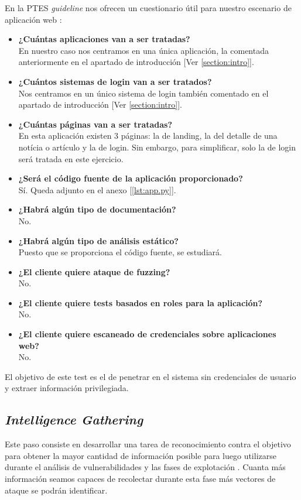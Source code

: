 \documentclass[a4paper,oneside]{article}
\begin{document}
En la PTES \textit{guideline} nos ofrecen un cuestionario útil para nuestro escenario de aplicación web \cite{prengage}:
\begin{itemize}
\item \textbf{¿Cuántas aplicaciones van a ser tratadas?}\\
En nuestro caso nos centramos en una única aplicación, la comentada anteriormente en el apartado de introducción [Ver \ref{section:intro}].
\item \textbf{¿Cuántos sistemas de login van a ser tratados?}\\
Nos centramos en un único sistema de login también comentado en el apartado de introducción [Ver \ref{section:intro}].

\pagebreak
\item \textbf{¿Cuántas páginas van a ser tratadas?}\\
En esta aplicación existen 3 páginas: la de landing, la del detalle de una notícia o artículo y la de login. Sin embargo, para simplificar, solo la de login será tratada en este ejercicio.
\item \textbf{¿Será el código fuente de la aplicación proporcionado?}\\
Sí. Queda adjunto en el anexo [\ref{lst:app.py}].
\item \textbf{¿Habrá algún tipo de documentación?}\\
No.
\item \textbf{¿Habrá algún tipo de análisis estático?}\\
Puesto que se proporciona el código fuente, se estudiará.
\item \textbf{¿El cliente quiere ataque de fuzzing?}\\
No.
\item \textbf{¿El cliente quiere tests basados en roles para la aplicación?}\\
No.
\item \textbf{¿El cliente quiere escaneado de credenciales sobre aplicaciones web?}\\
No.
\end{itemize}

El objetivo de este test es el de penetrar en el sistema sin credenciales de usuario y extraer información privilegiada.

\subsection{\textit{Intelligence Gathering}}
Este paso consiste en desarrollar una tarea de reconocimiento contra el objetivo para obtener la mayor cantidad de información posible para luego utilizarse durante el análisis de vulnerabilidades y las fases de explotación \cite{intelligence}.
Cuanta más información seamos capaces de recolectar durante esta fase más vectores de ataque se podrán identificar.\\
\end{document}
